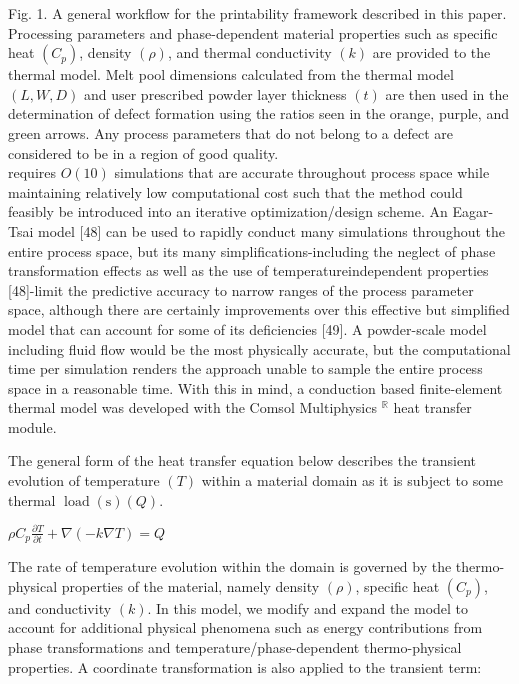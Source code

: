 \documentclass[10pt]{article}
\begin{document}
Fig. 1. A general workflow for the printability framework described in this paper. Processing parameters and phase-dependent material properties such as specific heat $\left(C_{p}\right)$, density $(\rho)$, and thermal conductivity $(k)$ are provided to the thermal model. Melt pool dimensions calculated from the thermal model $(L, W, D)$ and user prescribed powder layer thickness $(t)$ are then used in the determination of defect formation using the ratios seen in the orange, purple, and green arrows. Any process parameters that do not belong to a defect are considered to be in a region of good quality.\\
requires $O(10)$ simulations that are accurate throughout process space while maintaining relatively low computational cost such that the method could feasibly be introduced into an iterative optimization/design scheme. An Eagar-Tsai model [48] can be used to rapidly conduct many simulations throughout the entire process space, but its many simplifications-including the neglect of phase transformation effects as well as the use of temperatureindependent properties [48]-limit the predictive accuracy to narrow ranges of the process parameter space, although there are certainly improvements over this effective but simplified model that can account for some of its deficiencies [49]. A powder-scale model including fluid flow would be the most physically accurate, but the computational time per simulation renders the approach unable to sample the entire process space in a reasonable time. With this in mind, a conduction based finite-element thermal model was developed with the Comsol Multiphysics ${ }^{\mathbb{R}}$ heat transfer module.

The general form of the heat transfer equation below describes the transient evolution of temperature $(T)$ within a material domain as it is subject to some thermal $\operatorname{load}(\mathrm{s})(Q)$.

$\rho C_{p} \frac{\partial T}{\partial t}+\nabla(-k \nabla T)=Q$

The rate of temperature evolution within the domain is governed by the thermo-physical properties of the material, namely density $(\rho)$, specific heat $\left(C_{p}\right)$, and conductivity $(k)$. In this model, we modify and expand the model to account for additional physical phenomena such as energy contributions from phase transformations and temperature/phase-dependent thermo-physical properties. A coordinate transformation is also applied to the transient term:
\end{document}
